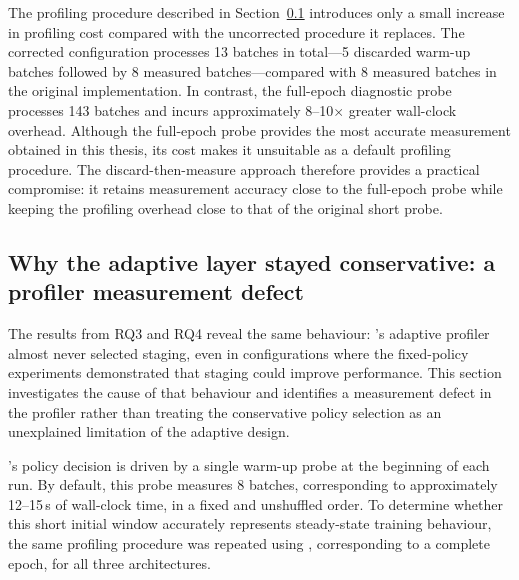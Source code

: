 The  profiling procedure described in Section~\ref{sec:res-profiler-bias} introduces only a small increase in profiling cost compared with the uncorrected procedure it replaces. The corrected configuration processes 13 batches in total---5 discarded warm-up batches followed by 8 measured batches---compared with 8 measured batches in the original implementation. In contrast, the full-epoch diagnostic probe processes 143 batches and incurs approximately 8--10$\times$ greater wall-clock overhead. Although the full-epoch probe provides the most accurate measurement obtained in this thesis, its cost makes it unsuitable as a default profiling procedure. The discard-then-measure approach therefore provides a practical compromise: it retains measurement accuracy close to the full-epoch probe while keeping the profiling overhead close to that of the original short probe.

\subsection{Why the adaptive layer stayed conservative: a profiler measurement defect}
\label{sec:res-profiler-bias}

The results from RQ3 and RQ4 reveal the same behaviour: \pads{}'s adaptive profiler almost never selected staging, even in configurations where the fixed-policy experiments demonstrated that staging could improve performance. This section investigates the cause of that behaviour and identifies a measurement defect in the profiler rather than treating the conservative policy selection as an unexplained limitation of the adaptive design.

\pads{}'s policy decision is driven by a single warm-up probe at the beginning of each run. By default, this probe measures 8 batches, corresponding to approximately 12--15\,s of wall-clock time, in a fixed and unshuffled order. To determine whether this short initial window accurately represents steady-state training behaviour, the same profiling procedure was repeated using , corresponding to a complete epoch, for all three architectures.

